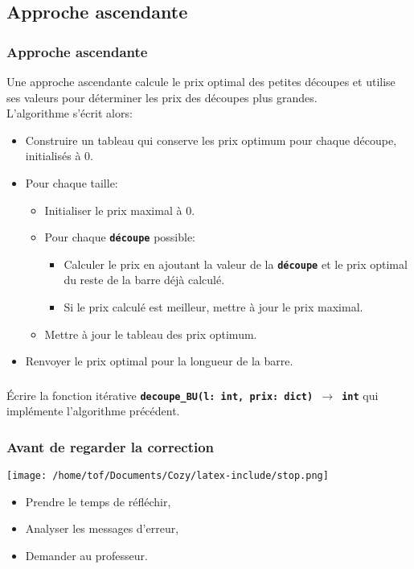 \documentclass[svgnames,11pt]{beamer}
\begin{document}
\subsection{Approche ascendante}
\begin{frame}
    \frametitle{Approche ascendante}

    Une approche ascendante calcule le prix optimal des petites découpes et utilise ses valeurs pour déterminer les prix des découpes plus grandes. \\L'algorithme s'écrit alors:
    \begin{itemize}
        \item Construire un tableau qui conserve les prix optimum pour chaque découpe, initialisés à 0.
        \item Pour chaque taille:
        \begin{itemize}
            \item Initialiser le prix maximal à 0.
            \item Pour chaque \texttt{\textbf{découpe}} possible:
            \begin{itemize}
                \item Calculer le prix en ajoutant la valeur de la \textbf{\texttt{découpe}} et le prix optimal du reste de la barre déjà calculé.
                \item Si le prix calculé est meilleur, mettre à jour le prix maximal.
            \end{itemize}
            \item Mettre à jour le tableau des prix optimum.
        \end{itemize}
        \item Renvoyer le prix optimal pour la longueur de la barre.
    \end{itemize}

\end{frame}
\begin{frame}
    \frametitle{}

    \begin{activite}
    Écrire la fonction itérative \textbf{\texttt{decoupe\_BU(l: int, prix: dict) $\rightarrow$ int}} qui implémente l'algorithme précédent.
    \end{activite}

\end{frame}
\begin{frame}
    \frametitle{Avant de regarder la correction}
\begin{center}
    \centering
    \texttt{[image: /home/tof/Documents/Cozy/latex-include/stop.png]}
    \end{center}
{\Large
    \begin{itemize}
        \item Prendre le temps de réfléchir,
        \item Analyser les messages d'erreur,
        \item Demander au professeur.
    \end{itemize}
}
\end{frame}
\end{document}
